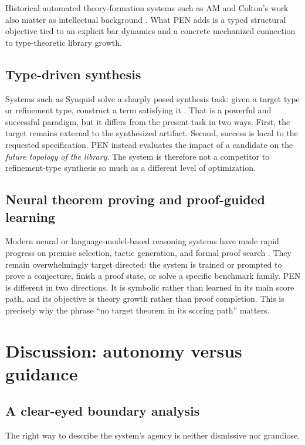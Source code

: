 \documentclass[pdflatex,sn-mathphys,Numbered]{sn-jnl}
\theoremstyle{thmstyleone}
\theoremstyle{thmstylethree}
\theoremstyle{thmstyletwo}
\begin{document}
Historical automated theory-formation systems such as AM and Colton's work also matter as intellectual background \cite{lenat,colton}. What PEN adds is a typed structural objective tied to an explicit bar dynamics and a concrete mechanized connection to type-theoretic library growth.

\subsection{Type-driven synthesis}

Systems such as Synquid solve a sharply posed synthesis task: given a target type or refinement type, construct a term satisfying it \cite{synquid}. That is a powerful and successful paradigm, but it differs from the present task in two ways. First, the target remains external to the synthesized artifact. Second, success is local to the requested specification. PEN instead evaluates the impact of a candidate on the \emph{future topology of the library}. The system is therefore not a competitor to refinement-type synthesis so much as a different level of optimization.

\subsection{Neural theorem proving and proof-guided learning}

Modern neural or language-model-based reasoning systems have made rapid progress on premise selection, tactic generation, and formal proof search \cite{leandojo,alphageometry}. They remain overwhelmingly target directed: the system is trained or prompted to prove a conjecture, finish a proof state, or solve a specific benchmark family. PEN is different in two directions. It is symbolic rather than learned in its main score path, and its objective is theory growth rather than proof completion. This is precisely why the phrase ``no target theorem in its scoring path'' matters.

\section{Discussion: autonomy versus guidance}\label{sec:discussion}

\subsection{A clear-eyed boundary analysis}

The right way to describe the system's agency is neither dismissive nor grandiose.
\end{document}
